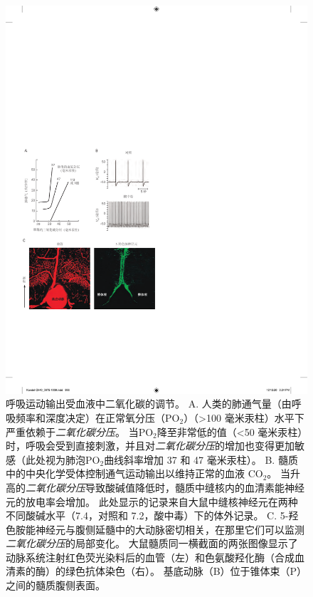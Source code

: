 \begin{figure}[htbp]
	\centering
	\includegraphics[width=1.0\linewidth]{chap40/fig_40_9}
	\caption{呼吸运动输出受血液中二氧化碳的调节。
		A. 人类的肺通气量（由呼吸频率和深度决定）在正常氧分压（PO$_2$）（>100 毫米汞柱）水平下严重依赖于\textit{二氧化碳分压}。
		当PO$_2$降至非常低的值（<50 毫米汞柱）时，呼吸会受到直接刺激，并且对\textit{二氧化碳分压}的增加也变得更加敏感（此处视为肺泡PO$_2$曲线斜率增加 37 和 47 毫米汞柱）。
		B. 髓质中的中央化学受体控制通气运动输出以维持正常的血液 CO$_2$。
		当升高的\textit{二氧化碳分压}导致酸碱值降低时，髓质中缝核内的血清素能神经元的放电率会增加。
		此处显示的记录来自大鼠中缝核神经元在两种不同酸碱水平（7.4，对照和 7.2，酸中毒）下的体外记录\cite{wang2002quantification}。
		C. 5-羟色胺能神经元与腹侧延髓中的大动脉密切相关，在那里它们可以监测\textit{二氧化碳分压}的局部变化。
		大鼠髓质同一横截面的两张图像显示了动脉系统注射红色荧光染料后的血管（左）和色氨酸羟化酶（合成血清素的酶）的绿色抗体染色（右）。
		基底动脉（B）位于锥体束（P）之间的髓质腹侧表面\cite{bradley2002chemosensitive}。}
	\label{fig:40_9}
\end{figure}


